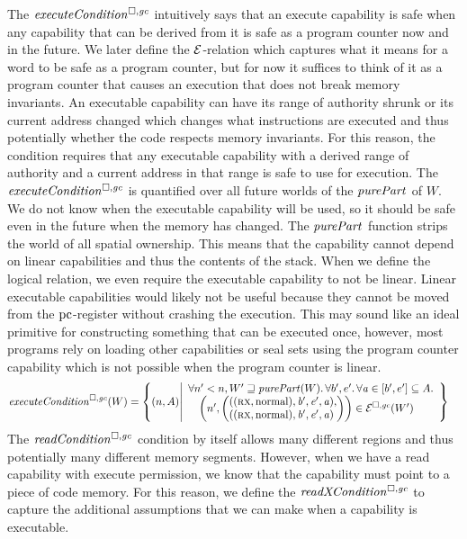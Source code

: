 \begin{jversion}
The $\execCond{}$ intuitively says that an execute capability is safe when any capability that can be derived from it is safe as a program counter now and in the future.
We later define the $\mathcal{E}$-relation which captures what it means for a word to be safe as a program counter, but for now it suffices to think of it as a program counter that causes an execution that does not break memory invariants.
An executable capability can have its range of authority shrunk or its current address changed which changes what instructions are executed and thus potentially whether the code respects memory invariants.
For this reason, the condition requires that any executable capability with a derived range of authority and a current address in that range is safe to use for execution.
The $\execCond{}$ is quantified over all future worlds of the $\purePart{}$ of $W$.
We do not know when the executable capability will be used, so it should be safe even in the future when the memory has changed.
The $\purePart{}$ function strips the world of all spatial ownership.
This means that the capability cannot depend on linear capabilities and thus the contents of the stack.
When we define the logical relation, we even require the executable capability to not be linear.
Linear executable capabilities would likely not be useful because they cannot be moved from the $\mathrm{pc}$-register without crashing the execution.
This may sound like an ideal primitive for constructing something that can be executed once, however, most programs rely on loading other capabilities or seal sets using the program counter capability which is not possible when the program counter is linear.
\begin{align*}
  \execCond{W} &=
  \left\{ \npair{A} \middle|
    \begin{array}{l}
      \forall n' < n, W' \future \purePart{W}\ldotp \forall b',e'\ldotp \forall \aaddr \in [b',e'] \subseteq A \ldotp\\
      \quad \npair[n']{\left( \arraycolsep=0pt\array{l}((\rx,\normal),\baddr',\eaddr',\aaddr),\\((\rx,\normal),\baddr',\eaddr',\aaddr)\endarray\right)} \in \lre(W')
    \end{array}
    \right\}
\end{align*}
The $\readCond{}$ condition by itself allows many different regions and thus potentially many different memory segments.
However, when we have a read capability with execute permission, we know that the capability must point to a piece of code memory.
For this reason, we define the $\xReadCond{}$ to capture the additional assumptions that we can make when a capability is executable.

\end{jversion}
